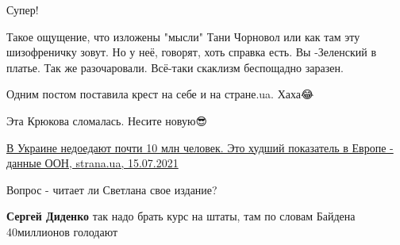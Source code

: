 \begin{itemize}
Супер!

 
Такое ощущение, что изложены "мысли" Тани Чорновол или как там эту шизофреничку
зовут. Но у неё, говорят, хоть справка есть. Вы -Зеленский в платье. Так же
разочаровали. Всё-таки скаклизм беспощадно заразен.

 
Одним постом поставила крест на себе и на стране.ua. Хаха😂🖕

 
Эта Крюкова сломалась. Несите новую😎

 
\href{https://strana.ua/news/343776-holod-v-ukraine-ot-nekhvatki-edy-stradajut-pochti-10-mln-chelovek.html}{
В Украине недоедают почти 10 млн человек. Это худший показатель в Европе - данные ООН, strana.ua, 15.07.2021}

Вопрос - читает ли Светлана свое издание?

\begin{itemize}
 
\textbf{Сергей Диденко} так надо брать курс на штаты, там по словам Байдена 40миллионов голодают
\end{itemize}

 

\end{itemize}
